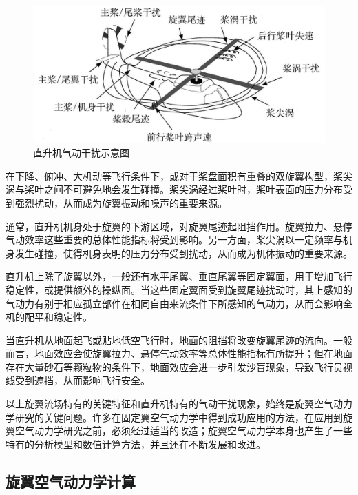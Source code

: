 \begin{figure}[h!]
\centering{}\includegraphics[width=1\textwidth,height=0.22\textheight,keepaspectratio]{../review/figures/aero-interaction}
\caption{\label{fig:helicopter-aerodynamic-interference}直升机气动干扰示意图}
\end{figure}

\begin{description}[wide]
\item [{桨–涡干扰}] 在下降、俯冲、大机动等飞行条件下，或对于桨盘面积有重叠的双旋翼构型，桨尖涡与桨叶之间不可避免地会发生碰撞。桨尖涡经过桨叶时，桨叶表面的压力分布受到强烈扰动，从而成为旋翼振动和噪声的重要来源。
\item [{旋翼–机身干扰}] 通常，直升机机身处于旋翼的下游区域，对旋翼尾迹起阻挡作用。旋翼拉力、悬停气动效率这些重要的总体性能指标将受到影响。另一方面，桨尖涡以一定频率与机身发生碰撞，使得机身表明的压力分布受到扰动，从而成为机体振动的重要来源。 
\item [{旋翼–固定翼干扰}] 直升机上除了旋翼以外，一般还有水平尾翼、垂直尾翼等固定翼面，用于增加飞行稳定性，或提供额外的操纵面。当这些固定翼面受到旋翼尾迹扰动时，其上感知的气动力有别于相应孤立部件在相同自由来流条件下所感知的气动力，从而会影响全机的配平和稳定性。
\item [{旋翼–地面干扰}] 当直升机从地面起飞或贴地低空飞行时，地面的阻挡将改变旋翼尾迹的流向。一般而言，地面效应会使旋翼拉力、悬停气动效率等总体性能指标有所提升；但在地面存在大量砂石等颗粒物的条件下，地面效应会进一步引发沙盲现象，导致飞行员视线受到遮挡，从而影响飞行安全。 
\end{description}
%
以上旋翼流场特有的关键特征和直升机特有的气动干扰现象，始终是旋翼空气动力学研究的关键问题。许多在固定翼空气动力学中得到成功应用的方法，在应用到旋翼空气动力学研究之前，必须经过适当的改造；旋翼空气动力学本身也产生了一些特有的分析模型和数值计算方法，并且还在不断发展和改进。

\subsection{旋翼空气动力学计算}

